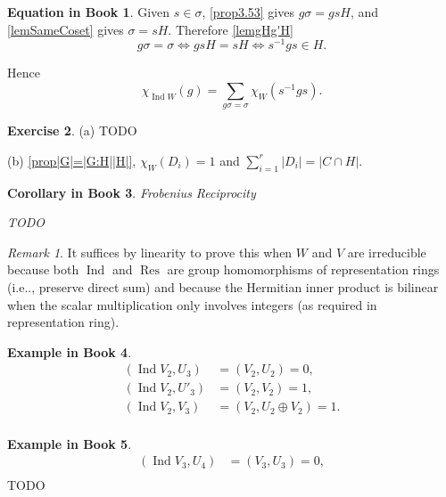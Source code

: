 \documentclass[12pt, letterpaper]{article}
\makeatletter
\newcommand{\Res}{\operatorname{Res}}
\newcommand{\Ind}{\operatorname{Ind}}
\newcommand\ie{i.e\@ifnextchar.{}{.\@}}
\newcommand{\red}[1]{{\color{red} #1}}
\newcommand{\card}[1]{\left\lvert #1 \right\rvert}
\theoremstyle{definition}
\theoremstyle{remark}
\newtheorem*{rem*}{Remark}
\theoremstyle{definition}
\newtheorem{exe}{Exercise}[section]
\newtheorem{exam}[exe]{Example in Book}
\newtheorem{eq}[exe]{Equation in Book}
\theoremstyle{plain}
\newtheorem{ccor}[exe]{Corollary in Book}
\numberwithin{equation}{section}
\makeatother
\begin{document}
	\begin{eq}
		Given $s\in\sigma$, \ref{prop3.53} gives $g\sigma=gsH$,
		and  \ref{lemSameCoset} gives $\sigma=sH$.
		Therefore \ref{lemgHg'H}
		\[g\sigma=\sigma \iff gsH=sH \iff s^{-1}gs\in H.\]
		
		Hence
		\[\chi_{\Ind W}(g)=\sum_{g\sigma=\sigma}\chi_W(s^{-1}gs).\]
	\end{eq}

	\begin{exe}
		(a) \red{TODO}
		
		(b) \ref{prop|G|=|G:H||H|}, $\chi_W(D_i)=1$ and $\sum_{i=1}^r\card{D_i}=\card{C\cap H}$.
	\end{exe}

	\begin{ccor}
		Frobenius Reciprocity
		
		\red{TODO}
	\end{ccor}
	\begin{rem*}
		It suffices by linearity to prove this when $W$ and $V$ are irreducible
		because both $\Ind$ and $\Res$ are group homomorphisms of representation rings
		(\ie, preserve direct sum) and because the Hermitian inner product is bilinear
		when the scalar multiplication only involves integers (as required in representation ring).
	\end{rem*}

	\begin{exam}
		\[\begin{aligned}
			(\Ind V_2,U_3)&=(V_2,U_2)=0,\\
			(\Ind V_2,U'_3)&=(V_2,V_2)=1,\\
			(\Ind V_2,V_3)&=(V_2,U_2\oplus V_2)=1.\\
		\end{aligned} \]
	\end{exam}

	\begin{exam}
		\[\begin{aligned}
			(\Ind V_3,U_4)&=(V_3,U_3)=0,\\
		\end{aligned}\]
		\red{TODO}
	\end{exam}
	
\end{document}
